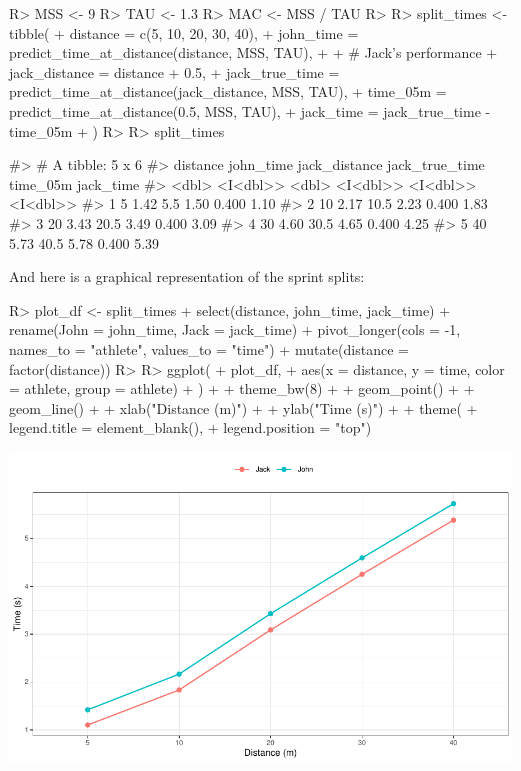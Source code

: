 \documentclass[
]{jss}
\begin{document}
\begin{CodeChunk}
\begin{CodeInput}
R> MSS <- 9
R> TAU <- 1.3
R> MAC <- MSS / TAU
R> 
R> split_times <- tibble(
+   distance = c(5, 10, 20, 30, 40),
+   john_time = predict_time_at_distance(distance, MSS, TAU),
+ 
+   # Jack's performance
+   jack_distance = distance + 0.5,
+   jack_true_time = predict_time_at_distance(jack_distance, MSS, TAU),
+   time_05m = predict_time_at_distance(0.5, MSS, TAU),
+   jack_time = jack_true_time - time_05m
+ )
R> 
R> split_times
\end{CodeInput}
\begin{CodeOutput}
#> # A tibble: 5 x 6
#>   distance john_time jack_distance jack_true_time time_05m jack_time
#>      <dbl>  <I<dbl>>         <dbl>       <I<dbl>> <I<dbl>>  <I<dbl>>
#> 1        5      1.42           5.5           1.50    0.400      1.10
#> 2       10      2.17          10.5           2.23    0.400      1.83
#> 3       20      3.43          20.5           3.49    0.400      3.09
#> 4       30      4.60          30.5           4.65    0.400      4.25
#> 5       40      5.73          40.5           5.78    0.400      5.39
\end{CodeOutput}
\end{CodeChunk}

And here is a graphical representation of the sprint splits:

\begin{CodeChunk}
\begin{CodeInput}
R> plot_df <- split_times %
+   select(distance, john_time, jack_time) %
+   rename(John = john_time, Jack = jack_time) %
+   pivot_longer(cols = -1, names_to = "athlete", values_to = "time") %
+   mutate(distance = factor(distance))
R> 
R> ggplot(
+   plot_df,
+   aes(x = distance, y = time, color = athlete, group = athlete)
+ ) +
+   theme_bw(8) +
+   geom_point() +
+   geom_line() +
+   xlab("Distance (m)") +
+   ylab("Time (s)") +
+   theme(
+     legend.title = element_blank(), 
+     legend.position = "top")
\end{CodeInput}


\begin{center}\includegraphics[width=1\linewidth]{paper_files/figure-latex/unnamed-chunk-20-1} \end{center}

\end{CodeChunk}
\end{document}
